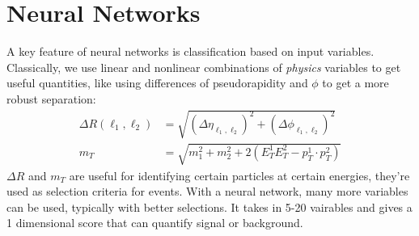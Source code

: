 \documentclass[12pt, a4paper]{book}
\begin{document}
		\section{Neural Networks}
			A key feature of neural networks is classification based on input variables. Classically, we use linear and nonlinear combinations of \emph{physics} variables to get useful quantities, like using differences of pseudorapidity and \(\phi\) to get a more robust separation:
			\begin{align}
			      \Delta R(\ell_1,\ell_2) 
				  &= \sqrt{(\Delta \eta_{\ell_1,\ell_2})^2 + (\Delta \phi_{\ell_1,\ell_2})^2} 
				  \\
				  m_T
				  &=\sqrt{m_1^2+m_2^2+2(E_T^1E_T^2-p^1_T\cdot p_T^2)}
			\end{align}
			\(\Delta R \) and \(m_T\) are useful for identifying certain particles at certain energies, they're used as selection criteria for events. With a neural network, many more variables can be used, typically with better selections. It takes in 5-20 vairables and gives a 1 dimensional score that can quantify signal or background. 
\end{document}
